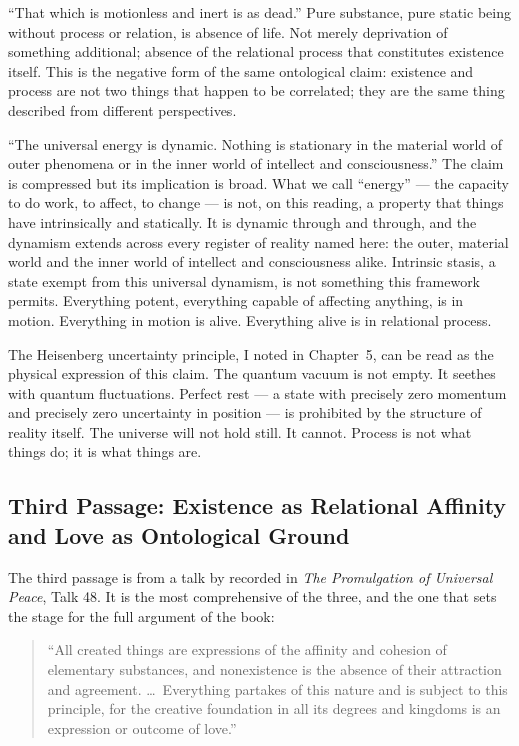 ``That which is motionless and inert is as dead.''
Pure substance, pure static being without process or relation, is absence of life.
Not merely deprivation of something additional; absence of the relational process
that constitutes existence itself.
This is the negative form of the same ontological claim: existence and process
are not two things that happen to be correlated; they are the same thing described
from different perspectives.

``The universal energy is dynamic. Nothing is stationary in the material world
of outer phenomena or in the inner world of intellect and consciousness.''
The claim is compressed but its implication is broad.
What we call ``energy'' --- the capacity to do work, to affect, to change --- is
not, on this reading, a property that things have intrinsically and statically.
It is dynamic through and through, and the dynamism extends across every register
of reality named here: the outer, material world and the inner world of
intellect and consciousness alike.
Intrinsic stasis, a state exempt from this universal dynamism, is not something
this framework permits.
Everything potent, everything capable of affecting anything, is in motion.
Everything in motion is alive.
Everything alive is in relational process.

The Heisenberg uncertainty principle, I noted in Chapter~5, can be read as the
physical expression of this claim.
The quantum vacuum is not empty.
It seethes with quantum fluctuations.
Perfect rest --- a state with precisely zero momentum and precisely zero uncertainty
in position --- is prohibited by the structure of reality itself.
The universe will not hold still.
It cannot.
Process is not what things do; it is what things are.

\subsection{Third Passage: Existence as Relational Affinity and Love as Ontological Ground}

The third passage is from a talk by \AbdulBaha recorded in \textit{The Promulgation
of Universal Peace}, Talk 48.
It is the most comprehensive of the three, and the one that sets the stage for
the full argument of the book:

\begin{quote}
``All created things are expressions of the affinity and cohesion of
elementary substances, and nonexistence is the absence of their
attraction and agreement. \ldots\ Everything partakes of this nature and is
subject to this principle, for the creative foundation in all its
degrees and kingdoms is an expression or outcome of love.''
\citep[Talk 48]{PUP}
\end{quote}

